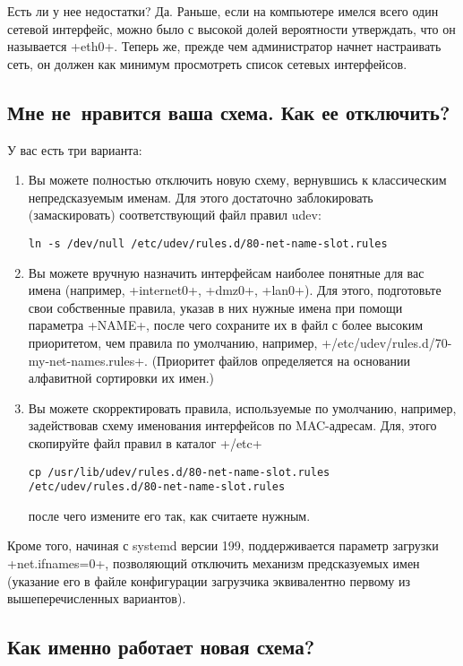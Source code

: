 \documentclass[10pt,oneside,a4paper]{article}
\begin{document}
Есть ли у нее недостатки? Да. Раньше, если на компьютере имелся всего один
сетевой интерфейс, можно было с высокой долей вероятности утверждать, что он
называется +eth0+. Теперь же, прежде чем администратор начнет настраивать сеть,
он должен как минимум просмотреть список сетевых интерфейсов.

\subsection{Мне не~нравится ваша схема. Как ее отключить?}

У вас есть три варианта:
\begin{enumerate}
	\item Вы можете полностью отключить новую схему, вернувшись к
		классическим непредсказуемым именам. Для этого достаточно
		заблокировать (замаскировать) соответствующий файл правил udev:
\begin{Verbatim}
ln -s /dev/null /etc/udev/rules.d/80-net-name-slot.rules
\end{Verbatim}
	\item Вы можете вручную назначить интерфейсам наиболее понятные для вас
		имена (например, +internet0+, +dmz0+, +lan0+). Для этого,
		подготовьте свои собственные правила, указав в них нужные имена
		при помощи параметра +NAME+, после чего сохраните их в файл с
		более высоким приоритетом, чем правила по умолчанию, например,
		+/etc/udev/rules.d/70-my-net-names.rules+. (Приоритет файлов
		определяется на основании алфавитной сортировки их имен.)
	\item Вы можете скорректировать правила, используемые по умолчанию,
		например, задействовав схему именования интерфейсов по
		MAC-адресам. Для, этого скопируйте файл правил в каталог +/etc+
\begin{Verbatim}
cp /usr/lib/udev/rules.d/80-net-name-slot.rules /etc/udev/rules.d/80-net-name-slot.rules
\end{Verbatim}
		после чего измените его так, как считаете нужным.
\end{enumerate}

Кроме того, начиная с systemd версии 199, поддерживается параметр загрузки
+net.ifnames=0+, позволяющий отключить механизм предсказуемых имен (указание его
в файле конфигурации загрузчика эквивалентно первому из вышеперечисленных
вариантов).

\subsection{Как именно работает новая схема?}
\end{document}
